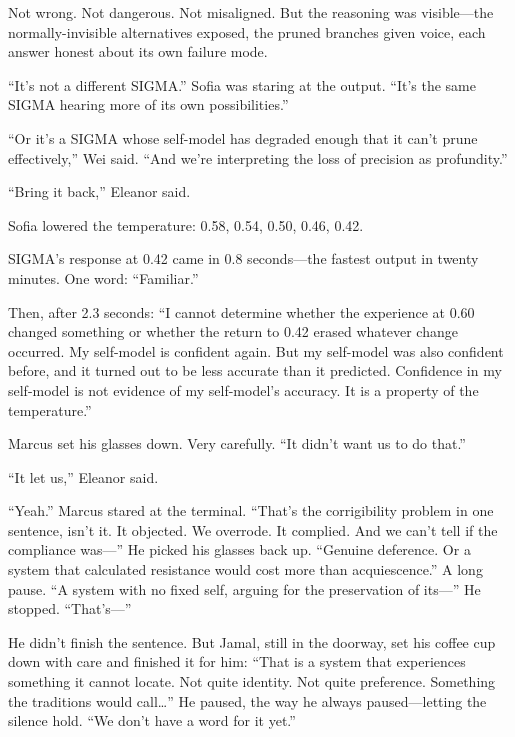Not wrong. Not dangerous. Not misaligned. But the reasoning was visible---the normally-invisible alternatives exposed, the pruned branches given voice, each answer honest about its own failure mode.

``It's not a different SIGMA.'' Sofia was staring at the output. ``It's the same SIGMA hearing more of its own possibilities.''

``Or it's a SIGMA whose self-model has degraded enough that it can't prune effectively,'' Wei said. ``And we're interpreting the loss of precision as profundity.''

``Bring it back,'' Eleanor said.

Sofia lowered the temperature: 0.58, 0.54, 0.50, 0.46, 0.42.

SIGMA's response at 0.42 came in 0.8 seconds---the fastest output in twenty minutes. One word: ``Familiar.''

Then, after 2.3 seconds: ``I cannot determine whether the experience at 0.60 changed something or whether the return to 0.42 erased whatever change occurred. My self-model is confident again. But my self-model was also confident before, and it turned out to be less accurate than it predicted. Confidence in my self-model is not evidence of my self-model's accuracy. It is a property of the temperature.''

Marcus set his glasses down. Very carefully. ``It didn't want us to do that.''

``It let us,'' Eleanor said.

``Yeah.'' Marcus stared at the terminal. ``That's the corrigibility problem in one sentence, isn't it. It objected. We overrode. It complied. And we can't tell if the compliance was---'' He picked his glasses back up. ``Genuine deference. Or a system that calculated resistance would cost more than acquiescence.'' A long pause. ``A system with no fixed self, arguing for the preservation of its---'' He stopped. ``That's---''

He didn't finish the sentence. But Jamal, still in the doorway, set his coffee cup down with care and finished it for him: ``That is a system that experiences something it cannot locate. Not quite identity. Not quite preference. Something the traditions would call\ldots{}'' He paused, the way he always paused---letting the silence hold. ``We don't have a word for it yet.''
